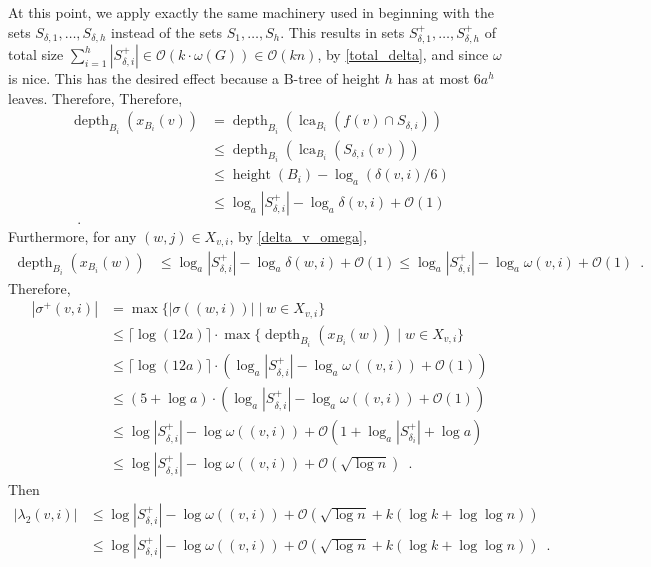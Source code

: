 \documentclass{patmorin}
\let\eqref\cref
\renewcommand{\ge}{\geqslant}
\renewcommand{\le}{\leqslant}
\DeclareMathOperator{\height}{height}
\DeclareMathOperator{\depth}{depth}
\DeclareMathOperator{\lca}{lca}
\newcommand{\Oh}{\mathcal{O}}
\begin{document}
  At this point, we apply exactly the same  machinery used in \cite{gawrychowski.janczewski:simpler,dujmovic.esperet.ea:adjacency} beginning with the sets $S_{\delta,1},\ldots,S_{\delta,h}$ instead of the sets $S_1,\ldots,S_h$.
  This results in sets $S^+_{\delta,1},\ldots,S^+_{\delta,h}$ of total size $\sum_{i=1}^h |S^+_{\delta,i}|\in \Oh(k\cdot\omega(G))\in \Oh(kn)$, by \eqref{total_delta}, and since $\omega$ is nice.
  This has the desired effect because a B-tree of height $h$ has at most $6a^h$ leaves.  Therefore,
  Therefore,
  \begin{align*}
     \depth_{B_i}(x_{B_i}(v))
     & =
     \depth_{B_i}(\lca_{B_i}(f(v)\cap S_{\delta,i})) \\
     & \le
     \depth_{B_i}(\lca_{B_i}(S_{\delta,i}(v))) \\
     & \le\height(B_i)-\log_a(\delta(v,i)/6)  \\
     & \le \log_a|S^+_{\delta,i}| - \log_a\delta(v,i) + \Oh(1) \\
    \enspace .
  \end{align*}
  Furthermore, for any $(w,j)\in X_{v,i}$, by \eqref{delta_v_omega}, 
  \begin{align*}
    \depth_{B_i}(x_{B_i}(w))
      & \le \log_a|S^+_{\delta,i}| - \log_a\delta(w,i) + \Oh(1) 
      \le \log_a|S^+_{\delta,i}| - \log_a\omega(v,i) + \Oh(1) \enspace .
  \end{align*}
  Therefore,
  \begin{align*}
     |\sigma^+(v,i)|
      & = \max\{|\sigma((w,i))| \mid w\in X_{v,i}\} \\
      & \le \lceil \log (12a)\rceil\cdot\max\{\depth_{B_i}(x_{B_i}(w)) \mid w\in X_{v,i}\} \\
      & \le \lceil \log (12a)\rceil\cdot (\log_a|S^+_{\delta,i}| - \log_a\omega((v,i)) + \Oh(1)) \\
      & \le (5+ \log a)\cdot (\log_a|S^+_{\delta,i}| - \log_a\omega((v,i)) + \Oh(1)) \\
      & \le \log |S^+_{\delta,i}| - \log\omega((v,i)) + \Oh(1+\log_a |S^+_{\delta_i}| + \log a) \\
      & \le \log |S^+_{\delta,i}| - \log\omega((v,i)) + \Oh(\sqrt{\log n})
      \enspace .
  \end{align*}
  Then
  \begin{align*}
     |\lambda_2(v,i)|
     & \le \log |S^+_{\delta,i}|-\log \omega((v,i)) + \Oh(\sqrt{\log n} + k(\log k+\log\log n)) \\
     & \le \log |S^+_{\delta,i}|-\log \omega((v,i)) + \Oh(\sqrt{\log n} + k(\log k+\log\log n)) \enspace .
  \end{align*}
\end{document}
